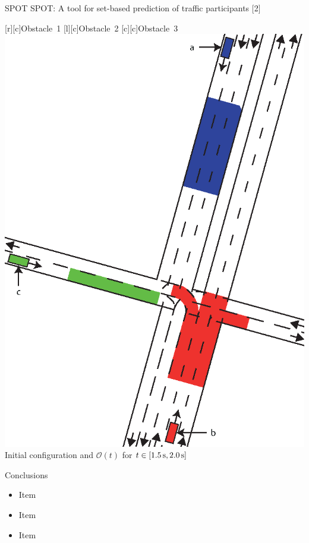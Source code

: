 \begin{frame}{SPOT}
SPOT: A tool for set-based prediction of traffic participants $[$2$]$%
\vspace{1em}

\begin{center}
	{\footnotesize
	[c]{Obstacle~1}	
	[c]{Obstacle~2}
	[c]{Obstacle~3}
	\includegraphics[height=0.5\textheight]{./figures/Scenario_Intersection_Occ_1,5-2,0s_final.eps}
	} \\
	\vspace{1em}
	Initial configuration and $\mathcal{O}(t)$ for $t \in [\unit[1.5]{s}, \unit[2.0]{s}]$
\end{center}

\end{frame}

\begin{frame}{Conclusions}

\begin{itemize}
\item Item
\vfill \item  Item
\vfill \item  Item
\end{itemize}

\end{frame}


